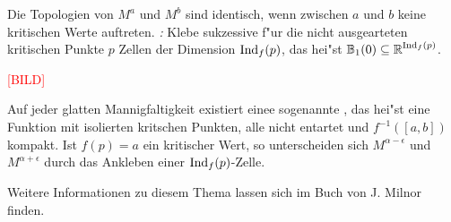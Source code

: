 \begin{center}
\end{center}
Die Topologien von $M^a$  und $M^b$ sind identisch, wenn zwischen $a$ und $b$ keine kritischen Werte auftreten.
\emph{:} Klebe sukzessive f"ur die nicht ausgearteten kritischen Punkte $p$ Zellen der Dimension $\operatorname{Ind}_f(p)$, das hei"st $\operatorname{\mathbb{B}}_1(0) \subseteq \operatorname{\mathbb{R}}^{\operatorname{Ind}_f(p)}$.
\begin{center}\textcolor{red}{[BILD]}\end{center}
Auf jeder glatten Mannigfaltigkeit existiert einee sogenannte , das hei"st eine Funktion mit isolierten kritschen Punkten, alle nicht entartet und $f^{-1}([a,b])$ kompakt. Ist $f(p) = a$ ein kritischer Wert, so unterscheiden sich $M^{\alpha - \epsilon}$ und $M^{\alpha + \epsilon}$ durch das Ankleben einer $\operatorname{Ind}_f(p)$-Zelle.

Weitere Informationen zu diesem Thema lassen sich im Buch  von J. Milnor \cite{milnor1963morsetheo} finden.

